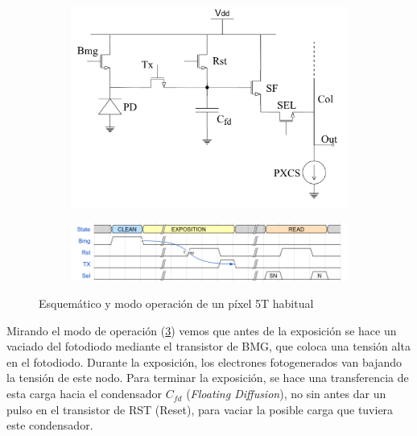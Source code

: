 \begin{figure}[h]
	\centering
	\begin{subfigure}{0.6\textwidth}
		\includegraphics[width=\textwidth]{img/pixel_5T.png}
		\caption{}
		\label{fig:pixel}
	\end{subfigure}

	\begin{subfigure}{\textwidth}
		\includegraphics[width=\textwidth]{img/pixel_wave.png}
		\caption{}
		\label{fig:pixel_op}
	\end{subfigure}
	\caption{Esquemático y modo operación de un píxel 5T habitual}
\end{figure}

Mirando el modo de operación (\ref{fig:pixel_op}) vemos que antes de la exposición se hace un vaciado del
fotodiodo mediante el transistor de BMG, que coloca una tensión alta en el fotodiodo.
Durante la exposición, los electrones fotogenerados van bajando la tensión de este
nodo. Para terminar la exposición, se hace una transferencia de esta carga hacia
el condensador $C_{fd}$ (\textit{Floating Diffusion}), no sin antes dar un pulso
en el transistor de RST (Reset), para vaciar la posible carga que tuviera este condensador.\\


